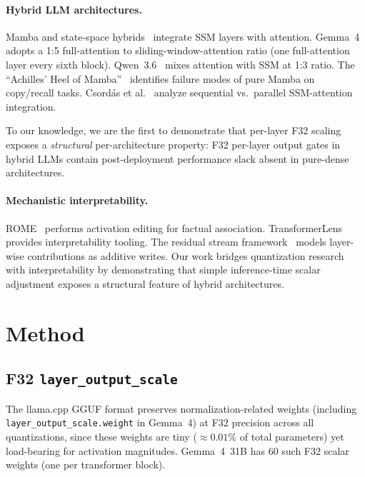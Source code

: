 \documentclass[11pt]{article}
\begin{document}
\paragraph{Hybrid LLM architectures.}
Mamba and state-space hybrids~\cite{mamba,mamba2hybrid} integrate SSM layers
with attention. Gemma~4~\cite{gemma4} adopts a 1:5 full-attention to sliding-window-attention ratio (one full-attention layer every sixth block). Qwen~3.6~\cite{qwen36} mixes attention with
SSM at 1:3 ratio. The ``Achilles' Heel of Mamba''~\cite{achillesmamba}
identifies failure modes of pure Mamba on copy/recall tasks. Csord\'as et
al.~\cite{understandingmambatransformer} analyze sequential vs.\ parallel
SSM-attention integration.

To our knowledge, we are the first to demonstrate that per-layer F32 scaling
exposes a \emph{structural} per-architecture property: F32 per-layer output gates in hybrid LLMs contain post-deployment performance slack absent in pure-dense architectures.

\paragraph{Mechanistic interpretability.}
ROME~\cite{rome} performs activation editing for factual association.
TransformerLens~\cite{transformerlens} provides interpretability tooling.
The residual stream framework~\cite{residualstream} models layer-wise
contributions as additive writes. Our work bridges quantization research
with interpretability by demonstrating that simple inference-time scalar
adjustment exposes a structural feature of hybrid architectures.

\section{Method}
\label{sec:method}

\subsection{F32 \texttt{layer\_output\_scale}}

The llama.cpp GGUF format preserves normalization-related weights (including
\texttt{layer\_output\_scale.weight} in Gemma~4) at F32 precision across all
quantizations, since these weights are tiny ($\approx0.01\%$ of total
parameters) yet load-bearing for activation magnitudes. Gemma~4~31B has 60
such F32 scalar weights (one per transformer block).
\end{document}
